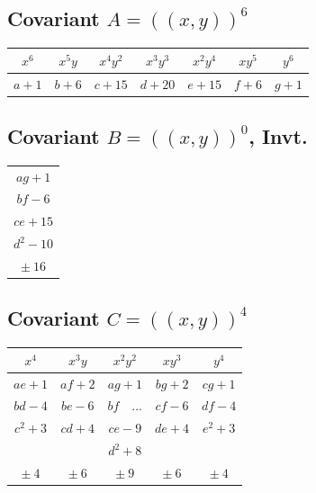 \documentclass[11pt,a4paper]{article}
\theoremstyle{cayley}
\begin{document}
\newpage

\subsection*{Covariant $A = (\!\!(x,y)\!\!)^{6}$}

\begin{center}
\begin{tabular}{|c|c|c|c|c|c|c|}
\hline
$x^{6}$ & $x^{5}y$ & $x^{4}y^{2}$ & $x^{3}y^{3}$ & $x^{2}y^{4}$ & $xy^{5}$ & $y^{6}$ \\
\hline
$a+1$ & $b+6$ & $c+15$ & $d+20$ & $e+15$ & $f+6$ & $g+1$ \\
\hline
\end{tabular}
\end{center}

\subsection*{Covariant $B = (\!\!(x,y)\!\!)^{0}$, Invt.}

\begin{center}
\begin{tabular}{|c|}
\hline
$ag+1$ \\
$bf-6$ \\
$ce+15$ \\
$d^{2}-10$ \\
\hline
$\pm\ 16$ \\
\hline
\end{tabular}
\end{center}

\subsection*{Covariant $C = (\!\!(x,y)\!\!)^{4}$}

\begin{center}
\begin{tabular}{|c|c|c|c|c|}
\hline
$x^{4}$ & $x^{3}y$ & $x^{2}y^{2}$ & $xy^{3}$ & $y^{4}$ \\
\hline
$ae+1$ & $af+2$ & $ag+1$ & $bg+2$ & $cg+1$ \\
$bd-4$ & $be-6$ & $bf\quad\dots$ & $cf-6$ & $df-4$ \\
$c^{2}+3$ & $cd+4$ & $ce-9$ & $de+4$ & $e^{2}+3$ \\
 &  & $d^{2}+8$ &  &  \\
\hline
$\pm\ 4$ & $\pm\ 6$ & $\pm\ 9$ & $\pm\ 6$ & $\pm\ 4$ \\
\hline
\end{tabular}
\end{center}
\end{document}
